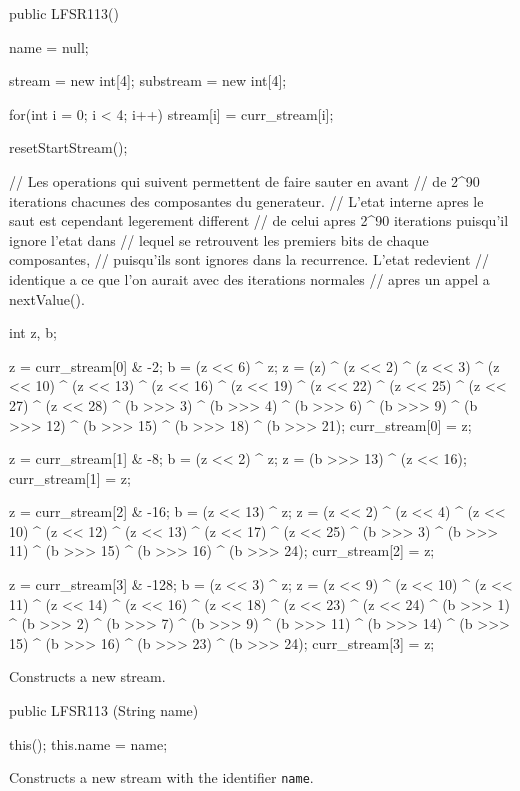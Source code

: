 \begin{code}
   public LFSR113() \begin{hide} {
      name = null;

      stream = new int[4];
      substream = new int[4];

      for(int i = 0; i < 4; i++)
         stream[i] = curr_stream[i];

      resetStartStream();


      // Les operations qui suivent permettent de faire sauter en avant
      // de 2^90 iterations chacunes des composantes du generateur.
      // L'etat interne apres le saut est cependant legerement different
      // de celui apres 2^90 iterations puisqu'il ignore l'etat dans
      // lequel se retrouvent les premiers bits de chaque composantes,
      // puisqu'ils sont ignores dans la recurrence. L'etat redevient
      // identique a ce que l'on aurait avec des iterations normales
      // apres un appel a nextValue().

      int z, b;

      z = curr_stream[0] & -2;
      b = (z <<  6) ^ z;
      z = (z) ^ (z << 2) ^ (z << 3) ^ (z << 10) ^ (z << 13) ^
         (z << 16) ^ (z << 19) ^ (z << 22) ^ (z << 25) ^
         (z << 27) ^ (z << 28) ^
         (b >>> 3) ^ (b >>> 4) ^ (b >>> 6) ^ (b >>> 9) ^ (b >>> 12) ^
         (b >>> 15) ^ (b >>> 18) ^ (b >>> 21);
      curr_stream[0] = z;


      z = curr_stream[1] & -8;
      b = (z <<  2) ^ z;
      z = (b >>> 13) ^ (z << 16);
      curr_stream[1] = z;


      z = curr_stream[2] & -16;
      b = (z <<  13) ^ z;
      z = (z << 2) ^ (z << 4) ^ (z << 10) ^ (z << 12) ^ (z << 13) ^
         (z << 17) ^ (z << 25) ^
         (b >>> 3) ^ (b >>> 11) ^ (b >>> 15) ^ (b >>> 16) ^ (b >>> 24);
      curr_stream[2] = z;


      z = curr_stream[3] & -128;
      b = (z <<  3) ^ z;
      z = (z << 9) ^ (z << 10) ^ (z << 11) ^ (z << 14) ^ (z << 16) ^
         (z << 18) ^ (z << 23) ^ (z << 24) ^
         (b >>> 1) ^ (b >>> 2) ^ (b >>> 7) ^ (b >>> 9) ^ (b >>> 11) ^
         (b >>> 14) ^ (b >>> 15) ^ (b >>> 16) ^ (b >>> 23) ^ (b >>> 24);
      curr_stream[3] = z;
   }\end{hide}
\end{code}
\begin{tabb} Constructs a new stream.
\end{tabb}
\begin{code}

   public LFSR113 (String name) \begin{hide} {
      this();
      this.name = name;
   }\end{hide}
\end{code}
\begin{tabb} Constructs a new stream with the identifier \texttt{name}.
\end{tabb}
\begin{htmlonly}
\end{htmlonly}

